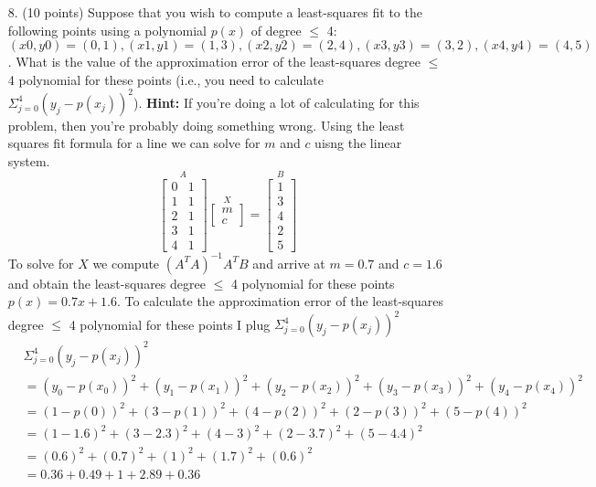 \documentclass{article}
\begin{document}
\begin{enumerate}
    \newpage
    \item[8.] (10 points) Suppose that you wish to compute a least-squares fit to the following points using a polynomial $p(x)$ of degree $\leq$ 4: $(x0, y0) = (0, 1),(x1, y1) = (1, 3),(x2, y2) = (2, 4),(x3, y3) = (3, 2),(x4, y4) = (4, 5)$.\newline
    What is the value of the approximation error of the least-squares degree $\leq$ 4 polynomial for these points (i.e., you need to calculate $\Sigma^4_{j=0}(y_j-p(x_j))^2$).
    \textbf{Hint: } If you’re doing a lot of calculating for this problem, then you’re probably doing something wrong.
    \newline
    \newline
    Using the least squares fit formula for a line we can solve for $m$ and $c$ uisng the linear system.
    \[\overset{A}{\begin{bmatrix}0 & 1\\1 & 1\\ 2 & 1 \\3 & 1\\ 4 & 1\end{bmatrix}}\overset{X}{\begin{bmatrix}m \\ c\end{bmatrix}} = \overset{B}{\begin{bmatrix}1\\3\\4\\2\\5\end{bmatrix}}\]
    To solve for $X$ we compute $(A^TA)^{-1}A^TB$ and arrive at $m=0.7$ and $c=1.6$ and obtain the least-squares degree $\leq$ 4 polynomial for these points $p(x)=0.7x+1.6$. To calculate the approximation error of the least-squares degree $\leq$ 4 polynomial for these points I plug $\Sigma^4_{j=0}(y_j-p(x_j))^2$
    \begin{align*}
        & \Sigma^4_{j=0}(y_j-p(x_j))^2 \\
        &= (y_0-p(x_0))^2 + (y_1-p(x_1))^2 + (y_2-p(x_2))^2 + (y_3-p(x_3))^2 + (y_4-p(x_4))^2 \\
        &= (1-p(0))^2 + (3-p(1))^2 + (4-p(2))^2 + (2-p(3))^2 + (5-p(4))^2 \\
        &= (1-1.6)^2 + (3-2.3)^2 + (4-3)^2 + (2-3.7)^2 + (5-4.4)^2 \\
        &= (0.6)^2 + (0.7)^2 + (1)^2 + (1.7)^2 + (0.6)^2 \\
        &= 0.36 + 0.49 + 1 + 2.89 + 0.36\\

\end{align*}
\end{enumerate}
\end{document}
